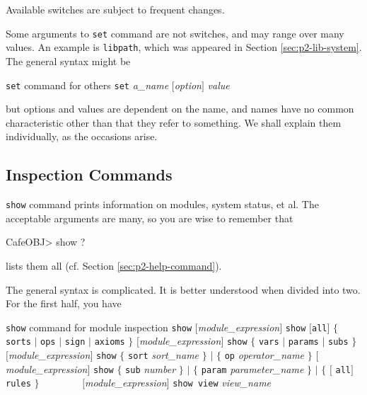 \documentclass[a4paper]{memoir}
\begin{document}
\begin{warning}
  Available switches are subject to frequent changes.
\end{warning}

Some arguments to \verb|set| command are not switches, and may range
over many values. An example is \verb|libpath|, which was appeared
in Section \ref{sec:p2-lib-system}. The general syntax might be

\begin{bsyntax} \texttt{set} command for others  \Hline
\texttt{set} \textit{a\_name} $[$\textit{option}$]$ \textit{value}
\end{bsyntax}

but options and values are dependent on the name, and names have no
common characteristic other than that they refer to something.
We shall explain them individually, as the occasions arise.

\subsection{Inspection Commands}\label{sec:p2-show-command}

\verb|show| command prints information on modules, system status, et al.
The acceptable arguments are many, so you are wise to remember that
\begin{vvtm}
\begin{ccode}
  CafeOBJ> show ?
\end{ccode}
\end{vvtm}
lists them all (cf. Section \ref{sec:p2-help-command}).

The general syntax is complicated. It is better understood
when divided into two. For the first half, you have

\begin{bsyntax} \texttt{show} command for module inspection\Hline
{}
\texttt{show} $[$\textit{module\_expression}$]$
\texttt{show} $[$\texttt{all}$]$ $\{$ \texttt{sorts} $|$ \texttt{ops} $|$ \texttt{sign} $|$ \texttt{axioms} $\}$ $[$\textit{module\_expression}$]$
\texttt{show} $\{$ \texttt{vars} $|$ \texttt{params} $|$ \texttt{subs} $\}$ $[$\textit{module\_expression}$]$
\texttt{show} $\{$ \texttt{sort} \textit{sort\_name} $\}$ $|$ $\{$ \texttt{op} \textit{operator\_name} $\}$ $[$ \textit{module\_expression}$]$
\texttt{show} $\{$ \texttt{sub} \textit{number} $\}$ $|$ $\{$ \texttt{param} \textit{parameter\_name} $\}$ $|$ $\{$ $[$ \texttt{all}$]$ \texttt{rules} $\}$ 
~~~~~~~~$[$\textit{module\_expression}$]$
\texttt{show view} \textit{view\_name}
\end{bsyntax}
\end{document}
